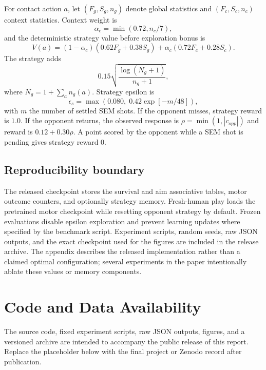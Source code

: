 \documentclass[10pt,twocolumn]{article}
\begin{document}
For contact action $a$, let $(F_g,S_g,n_g)$ denote global statistics and $(F_c,S_c,n_c)$ context statistics. Context weight is
\begin{equation}
\alpha_c=\min(0.72,n_c/7),
\end{equation}
and the deterministic strategy value before exploration bonus is
\begin{equation}
V(a)=(1-\alpha_c)(0.62F_g+0.38S_g)+\alpha_c(0.72F_c+0.28S_c).
\end{equation}
The strategy adds
\begin{equation}
0.15\sqrt{\frac{\log(N_g+1)}{n_g+1}},
\end{equation}
where $N_g=1+\sum_a n_g(a)$. Strategy epsilon is
\begin{equation}
\epsilon_s=\max\left(0.080,\;0.42\exp[-m/48]\right),
\end{equation}
with $m$ the number of settled SEM shots. If the opponent misses, strategy reward is $1.0$. If the opponent returns, the observed response is $\rho=\min(1,|c_{opp}|)$ and reward is $0.12+0.30\rho$. A point scored by the opponent while a SEM shot is pending gives strategy reward $0$.

\subsection{Reproducibility boundary}
The released checkpoint stores the survival and aim associative tables, motor outcome counters, and optionally strategy memory. Fresh-human play loads the pretrained motor checkpoint while resetting opponent strategy by default. Frozen evaluations disable epsilon exploration and prevent learning updates where specified by the benchmark script. Experiment scripts, random seeds, raw JSON outputs, and the exact checkpoint used for the figures are included in the release archive. The appendix describes the released implementation rather than a claimed optimal configuration; several experiments in the paper intentionally ablate these values or memory components.

\section*{Code and Data Availability}
The source code, fixed experiment scripts, raw JSON outputs, figures, and a versioned archive are intended to accompany the public release of this report. Replace the placeholder below with the final project or Zenodo record after publication.
\end{document}
